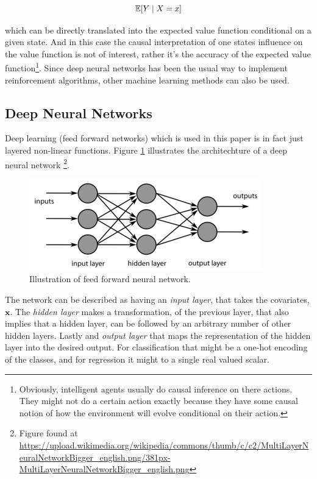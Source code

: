 \begin{equation}
    \mathbb{E}[Y \mid X=x]
\end{equation}

which can be directly translated into the expected value function conditional on a given state. And in this case the causal interpretation of one states influence on the value function is not of interest, rather it's the accuracy of the expected value function\footnote{Obviously, intelligent agents usually do causal inference on there actions. They might not do a certain action exactly because they have some causal notion of how the environment will evolve conditional on their action.}. Since deep neural networks has been the usual way to implement reinforcement algorithms, other machine learning methods can also be used.

\subsection{Deep Neural Networks}

Deep learning (feed forward networks) which is used in this paper is in fact just layered non-linear functions. Figure \ref{fig:feedforwardnetwork} illustrates the architechture of a deep neural network \footnote{Figure found at \url{https://upload.wikimedia.org/wikipedia/commons/thumb/c/c2/MultiLayerNeuralNetworkBigger_english.png/381px-MultiLayerNeuralNetworkBigger_english.png}}.

\begin{figure}[ht]
    \centering
    \includegraphics[scale=0.6]{figures/feedforwardnetworkillustration.png}
    \caption{Illustration of feed forward neural network. }
    \label{fig:feedforwardnetwork}
\end{figure}

The network can be described as having an \textit{input layer}, that takes the covariates, $\textbf{x}$. The \textit{hidden layer} makes a transformation, of the previous layer, that also implies that a hidden layer, can be followed by an arbitrary number of other hidden layers. Lastly and \textit{output layer} that maps the representation of the hidden layer into the desired output. For classification that might be a one-hot encoding of the classes, and for regression it might to a single real valued scalar.

